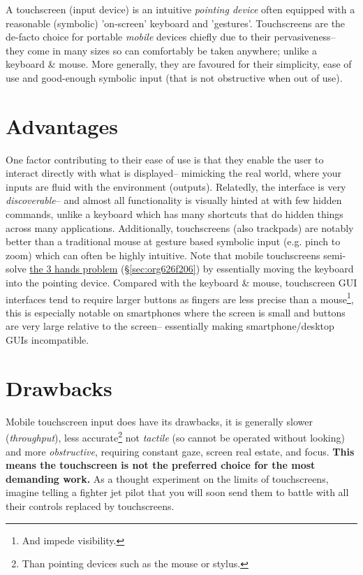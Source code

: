 \documentclass[logo,bsc,singlespacing,parskip]{infthesis}
\begin{document}
A touchscreen (input device) is an intuitive  \emph{pointing device} often equipped with a reasonable (symbolic) 'on-screen' keyboard and 'gestures'.
Touchscreens are the de-facto choice for portable \emph{mobile} devices chiefly due to their pervasiveness-- they come in many sizes so can comfortably be taken anywhere; unlike a keyboard \& mouse.
More generally, they are favoured for their simplicity, ease of use and good-enough symbolic input (that is not obstructive when out of use).
\section{Advantages}
\label{sec:orge695caa}
One factor contributing to their ease of use is that they enable the user to interact directly with what is displayed-- mimicking the real world, where your inputs are fluid with the environment (outputs).
Relatedly, the interface is very \emph{discoverable}-- and almost all functionality is visually hinted at with few hidden commands, unlike a keyboard which has many shortcuts that do hidden things across many applications.
Additionally, touchscreens (also trackpads) are notably better than a traditional mouse at gesture based symbolic input (e.g. pinch to zoom) which can often be highly intuitive.
Note that mobile touchscreens semi-solve \hyperref[sec:org626f206]{the 3 hands problem} (\S \ref{sec:org626f206}) by essentially moving the keyboard into the pointing device.
Compared with the keyboard \& mouse, touchscreen GUI interfaces tend to require larger buttons as fingers are less precise than a mouse\footnote{And impede visibility.}, this is especially notable on smartphones where the screen is small and buttons are very large relative to the screen-- essentially making smartphone/desktop GUIs incompatible.

\section{Drawbacks}
\label{sec:org405100b}
Mobile touchscreen input does have its drawbacks, it is generally slower (\emph{throughput}), less accurate\footnote{Than pointing devices such as the mouse or stylus.}   not \emph{tactile} (so cannot be operated without looking) and more \emph{obstructive}, requiring constant gaze, screen real estate, and focus.
\textbf{This means the touchscreen is not the preferred choice for the most demanding work.}
As a thought experiment on the limits of  touchscreens, imagine telling a fighter jet pilot that you will soon send them to battle with all their controls replaced by touchscreens.
\end{document}
